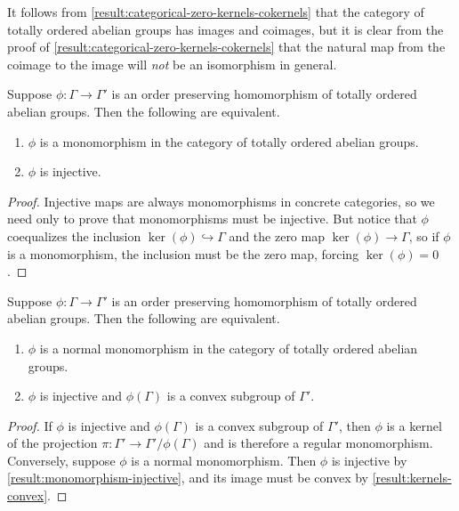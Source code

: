\begin{remark}
It follows from \cref{result:categorical-zero-kernels-cokernels} that the category of totally ordered abelian groups has images and coimages, but it is clear from the proof of \cref{result:categorical-zero-kernels-cokernels} that the natural map from the coimage to the image will \emph{not} be an isomorphism in general. 
\end{remark}

\begin{lemma}
\label{result:monomorphism-injective}
Suppose $\phi : \Gamma \to \Gamma'$ is an order preserving homomorphism of totally ordered abelian groups. Then the following are equivalent.  
\begin{enumerate}[label=(\alph{*})]
\item $\phi$ is a monomorphism in the category of totally ordered abelian groups. 
\item $\phi$ is injective. 
\end{enumerate}
\end{lemma}

\begin{proof}
Injective maps are always monomorphisms in concrete categories, so we need only to prove that monomorphisms must be injective. But notice that $\phi$ coequalizes the inclusion $\ker(\phi) \hookrightarrow \Gamma$ and the zero map $\ker(\phi) \to \Gamma$, so if $\phi$ is a monomorphism, the inclusion must be the zero map, forcing $\ker(\phi) = 0$. 
\end{proof}

\begin{lemma}
Suppose $\phi : \Gamma \to \Gamma'$ is an order preserving homomorphism of totally ordered abelian groups. Then the following are equivalent.  
\begin{enumerate}[label=(\alph{*})]
\item $\phi$ is a normal monomorphism in the category of totally ordered abelian groups. 
\item $\phi$ is injective and $\phi(\Gamma)$ is a convex subgroup of $\Gamma'$. 
\end{enumerate}
\end{lemma}

\begin{proof}
If $\phi$ is injective and $\phi(\Gamma)$ is a convex subgroup of $\Gamma'$, then $\phi$ is a kernel of the projection $\pi : \Gamma' \to \Gamma'/\phi(\Gamma)$ and is therefore a regular monomorphism. Conversely, suppose $\phi$ is a normal monomorphism. Then $\phi$ is injective by \cref{result:monomorphism-injective}, and its image must be convex by \cref{result:kernels-convex}. 
\end{proof}

